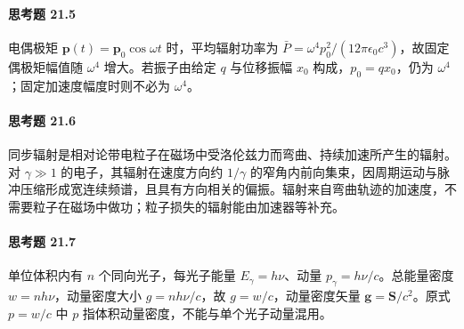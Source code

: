 \paragraph{思考题 21.5}
电偶极矩 \(\boldsymbol p(t)=\boldsymbol p_0\cos\omega t\) 时，平均辐射功率为 \(\boxed{\bar P=\omega^4p_0^2/(12\pi\epsilon_0c^3)}\)，故固定偶极矩幅值随 \(\omega^4\) 增大。若振子由给定 \(q\) 与位移振幅 \(x_0\) 构成，\(p_0=qx_0\)，仍为 \(\omega^4\)；固定加速度幅度时则不必为 \(\omega^4\)。

\paragraph{思考题 21.6}
同步辐射是相对论带电粒子在磁场中受洛伦兹力而弯曲、持续加速所产生的辐射。对 \(\gamma\gg1\) 的电子，其辐射在速度方向约 \(1/\gamma\) 的窄角内前向集束，因周期运动与脉冲压缩形成宽连续频谱，且具有方向相关的偏振。辐射来自弯曲轨迹的加速度，不需要粒子在磁场中做功；粒子损失的辐射能由加速器等补充。

\paragraph{思考题 21.7}
单位体积内有 \(n\) 个同向光子，每光子能量 \(E_\gamma=h\nu\)、动量 \(p_\gamma=h\nu/c\)。总能量密度 \(w=n h\nu\)，动量密度大小 \(g=n h\nu/c\)，故 \(\boxed{g=w/c}\)，动量密度矢量 \(\boldsymbol g=\boldsymbol S/c^2\)。原式 \(p=w/c\) 中 \(p\) 指体积动量密度，不能与单个光子动量混用。
